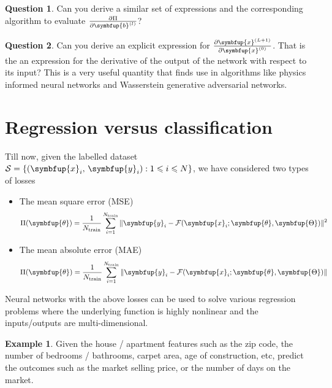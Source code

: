 \documentclass[11pt]{extarticle}
\newcommand{\vx}{\symbfup{x}}
\newcommand{\vb}{\symbfup{b}}
\newcommand{\vy}{\symbfup{y}}
\theoremstyle{definition}
\newcommand{\btheta}{\symbfup{\theta}}
\newcommand{\Hp}{\symbfup{\Theta}}
\newcommand{\df}[2]{\frac{\partial #1}{\partial #2}}
\newtheorem{example}{Example}%
\newtheorem{question}{Question}%
\begin{document}
\begin{question}
  Can you derive a similar set of expressions and the corresponding algorithm to evaluate $\df{\Pi}{\vb^{(l)}}$?
\end{question}

\begin{question}
  Can you derive an explicit expression for $\df{\vx^{(L+1)}}{\vx^{(0)}}$. That is the an expression for the derivative of the output of the network with respect to its input? This is a very useful quantity that finds use in algorithms like physics informed neural networks and Wasserstein generative adversarial networks. 
\end{question}

\section*{Regression versus classification}
Till now, given the labelled dataset $\mathcal{S} = \{(\vx_i,\,\vy_i): 1 \leqslant i \leqslant N\}$, we have considered two types of losses
\begin{itemize}
  \item The mean square error (MSE)
  \begin{align*}
    \Pi(\btheta) =  \frac{1}{N_\text{train}} \sum_{i=1}^{N_\text{train}}\|\vy_i - \mathcal{F}(\vx_i; \btheta, \Hp)\|^2
  \end{align*}
  \item The mean absolute error (MAE)
  \begin{align*}
  \Pi(\btheta) =  \frac{1}{N_\text{train}} \sum_{i=1}^{N_\text{train}}\|\vy_i - \mathcal{F}(\vx_i; \btheta, \Hp)\|
  \end{align*}
\end{itemize}

Neural networks with the above losses can be used to solve various regression problems where the underlying function is highly nonlinear and the inputs/outputs are multi-dimensional.
\begin{example}
  Given the house / apartment features such as the zip code, the number of bedrooms / bathrooms, carpet area, age of construction, etc, predict the outcomes such as the market selling price, or the number of days on the market.
\end{example}
\end{document}
